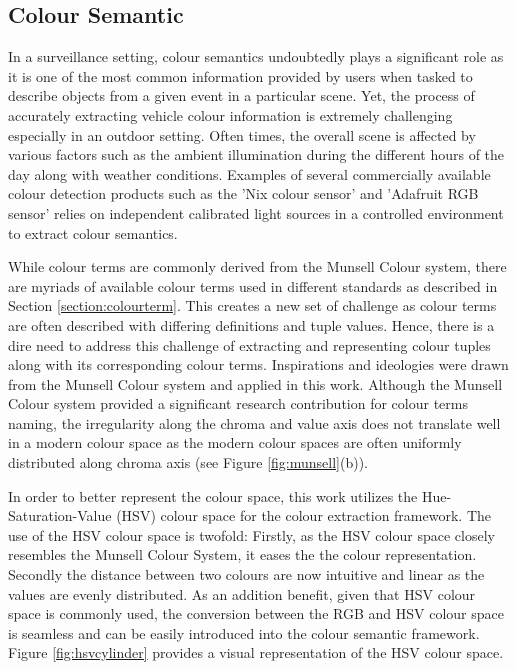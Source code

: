 \subsection{Colour Semantic}
\label{subsec:colorsemantics}

In a surveillance setting, colour semantics undoubtedly plays a significant role as it is one of the most common information provided by users when tasked to describe objects from a given event in a particular scene.
Yet, the process of accurately extracting vehicle colour information is extremely challenging especially in an outdoor setting. Often times, the overall scene is affected by various factors such as the ambient illumination during the different hours of the day along with weather conditions.
Examples of several commercially available colour detection products such as the 'Nix colour sensor' \cite{nixsensorltd} and 'Adafruit RGB sensor' \cite{adafruit} relies on independent calibrated light sources in a controlled environment to extract colour semantics.

While colour terms are commonly derived from the Munsell Colour system, there are myriads of available colour terms used in different standards as described in Section \ref{section:colourterm}.
This creates a new set of challenge as colour terms are often described with differing definitions and tuple values.
Hence, there is a dire need to address this challenge of extracting and representing colour tuples along with its corresponding colour terms.
Inspirations and ideologies were drawn from the Munsell Colour system and applied in this work.
Although the Munsell Colour system provided a significant research contribution for colour terms naming, the irregularity along the chroma and value axis does not translate well in a modern colour space as the modern colour spaces are often uniformly distributed along chroma axis (see Figure \ref{fig:munsell}(b)).

In order to better represent the colour space, this work utilizes the Hue-Saturation-Value (HSV) colour space for the colour extraction framework.
The use of the HSV colour space is twofold: Firstly, as the HSV colour space closely resembles the Munsell Colour System, it eases the the colour representation.
Secondly the distance between two colours are now intuitive and linear as the values are evenly distributed.
As an addition benefit, given that HSV colour space is commonly used, the conversion between the RGB and HSV colour space is seamless and can be easily introduced into the colour semantic framework. Figure \ref{fig:hsvcylinder} provides a visual representation of the HSV colour space.

